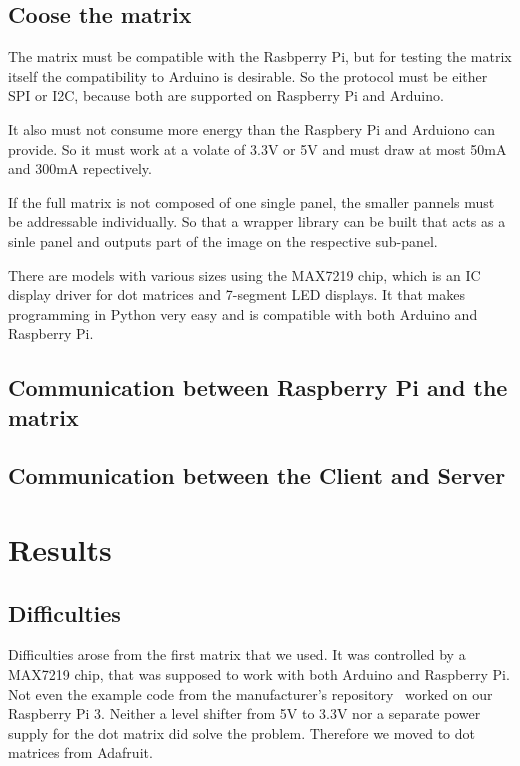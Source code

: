 \documentclass[conference]{IEEEtran}
\begin{document}
\subsection{Coose the matrix}
The matrix must be compatible with the Rasbperry Pi, but for testing the matrix itself the compatibility to Arduino is desirable. So the protocol must be either SPI or I2C, because both are supported on Raspberry Pi and Arduino.

It also must not consume more energy than the Raspbery Pi and Arduiono can provide. So it must work at a volate of 3.3V or 5V and must draw at most 50mA and 300mA repectively\cite{b0}.

If the full matrix is not composed of one single panel, the smaller pannels must be addressable individually. So that a wrapper library can be built that acts as a sinle panel and outputs part of the image on the respective sub-panel.

There are models with various sizes using the MAX7219 chip, which is an IC display driver for dot matrices and 7-segment LED displays. It that makes programming in Python very easy and is compatible with both Arduino and Raspberry Pi.


\subsection{Communication between Raspberry Pi and the matrix}

\subsection{Communication between the Client and Server}


\section{Results}

\subsection{Difficulties}
Difficulties arose from the first matrix that we used. It was controlled by a MAX7219 chip, that was supposed to work with both Arduino and Raspberry Pi. Not even the example code from the manufacturer's repository~\cite{b1} worked on our Raspberry Pi 3. Neither a level shifter from 5V to 3.3V nor a separate power supply for the dot matrix did solve the problem. Therefore we moved to dot matrices from Adafruit\cite{b2}.
\end{document}
